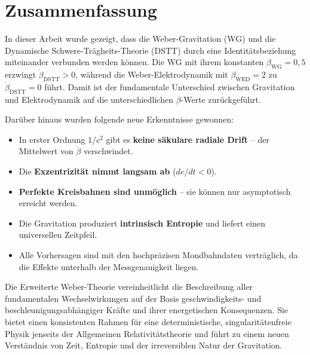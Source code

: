 \documentclass[12pt,a4paper]{article}
\begin{document}
\section{Zusammenfassung}

In dieser Arbeit wurde gezeigt, dass die Weber-Gravitation (WG) und die Dynamische Schwere-Trägheits-Theorie (DSTT) durch eine Identitätsbeziehung miteinander verbunden werden können. Die WG mit ihrem konstanten \(\beta_{\text{WG}} = 0,5\) erzwingt \(\dot{\beta}_{\text{DSTT}} > 0\), während die Weber-Elektrodynamik mit \(\beta_{\text{WED}} = 2\) zu \(\dot{\beta}_{\text{DSTT}} = 0\) führt. Damit ist der fundamentale Unterschied zwischen Gravitation und Elektrodynamik auf die unterschiedlichen \(\beta\)-Werte zurückgeführt.

Darüber hinaus wurden folgende neue Erkenntnisse gewonnen:

\begin{itemize}
    \item In erster Ordnung \(1/c^2\) gibt es \textbf{keine säkulare radiale Drift} – der Mittelwert von \(\dot{\beta}\) verschwindet.
    \item Die \textbf{Exzentrizität nimmt langsam ab} (\(de/dt < 0\)).
    \item \textbf{Perfekte Kreisbahnen sind unmöglich} – sie können nur asymptotisch erreicht werden.
    \item Die Gravitation produziert \textbf{intrinsisch Entropie} und liefert einen universellen Zeitpfeil.
    \item Alle Vorhersagen sind mit den hochpräzisen Mondbahndaten verträglich, da die Effekte unterhalb der Messgenauigkeit liegen.
\end{itemize}

Die Erweiterte Weber-Theorie vereinheitlicht die Beschreibung aller fundamentalen Wechselwirkungen auf der Basis geschwindigkeits- und beschleunigungsabhängiger Kräfte und ihrer energetischen Konsequenzen. Sie bietet einen konsistenten Rahmen für eine deterministische, singularitätenfreie Physik jenseits der Allgemeinen Relativitätstheorie und führt zu einem neuen Verständnis von Zeit, Entropie und der irreversiblen Natur der Gravitation.
\end{document}
